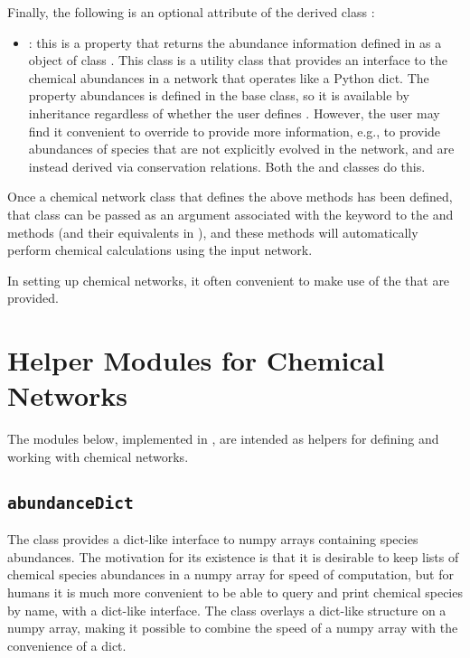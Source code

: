 \documentclass[letterpaper,10pt,english]{sphinxmanual}
\begin{document}
Finally, the following is an optional attribute of the derived class
:
\begin{itemize}
\item {} 
: this is a property that returns the abundance
information defined in  as a object of class
{\hyperref[chemistry:sssec\string-abundancedict]{}}. This class is a utility class that
provides an interface to the chemical abundances in a network
that operates like a Python dict. The property abundances is defined
in the base  class, so it is available by inheritance
regardless of whether the user defines . However,
the user may find it convenient to override
 to provide more information, e.g., to
provide abundances of species that are not explicitly evolved in the
network, and are instead derived via conservation relations. Both
the {\hyperref[chemistry:sssec\string-nl99]{}} and {\hyperref[chemistry:sssec\string-nl99\string-gc]{}} classes do this.

\end{itemize}

Once a chemical network class that defines the above methods has been
defined, that class can be passed as an argument associated with the
 keyword to the  and 
methods (and their equivalents in ), and these methods
will automatically perform chemical calculations using the input
network.

In setting up chemical networks, it often convenient to make use of
the {\hyperref[chemistry:ssec\string-chemhelpers]{}} that are provided.


\section{Helper Modules for Chemical Networks}
\label{chemistry:ssec-chemhelpers}\label{chemistry:helper-modules-for-chemical-networks}
The modules below, implemented in , are intended
as helpers for defining and working with chemical networks.


\subsection{\texttt{abundanceDict}}
\label{chemistry:sssec-abundancedict}\label{chemistry:abundancedict}
The  class provides a dict-like interface to numpy
arrays containing species abundances. The motivation for its existence
is that it is desirable to keep lists of chemical species abundances
in a numpy array for speed of computation, but for humans it is much
more convenient to be able to query and print chemical species by
name, with a dict-like interface. The  class overlays
a dict-like structure on a numpy array, making it possible to combine
the speed of a numpy array with the convenience of a dict.
\end{document}
